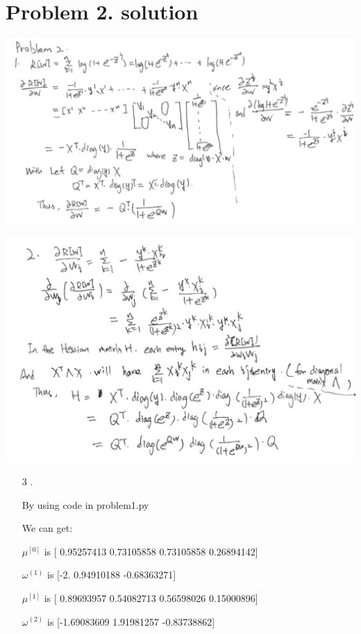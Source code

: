 \documentclass[11pt]{article}
\begin{document}
\section*{Problem 2. solution}

\includegraphics[scale=0.45]{3}

\includegraphics[scale=0.45]{4}
\begin{itemize}
\item[3].

By using code in problem1.py

We can get:

$\mu ^{[0]}$ is [ 0.95257413  0.73105858  0.73105858  0.26894142]

$\omega^{(1)}$ is  [-2.          0.94910188 -0.68363271]

$\mu ^{[1]}$ is [ 0.89693957  0.54082713  0.56598026  0.15000896]

$\omega^{(2)}$ is  [-1.69083609  1.91981257 -0.83738862]


\end{itemize}
\end{document}
